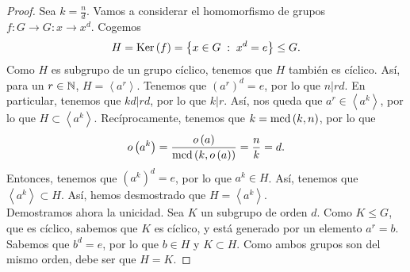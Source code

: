 \begin{proof}
Sea $\displaystyle k = \frac{n}{d} $. Vamos a considerar el homomorfismo de grupos $\displaystyle f : G \to G : x \to x^{d} $. Cogemos 
\[  H = \operatorname{Ker}\left(f\right) = \left\{ x \in G \; : \; x^{d} = e\right\} \leq G.\]
Como $\displaystyle H $ es subgrupo de un grupo cíclico, tenemos que $\displaystyle H $ también es cíclico. Así, para un $\displaystyle r \in \mathbb{N} $, $\displaystyle H = \left\langle a^{r} \right\rangle  $. Tenemos que $\displaystyle \left(a^{r}\right)^{d} = e $, por lo que $\displaystyle n | rd $. En particular, tenemos que $\displaystyle kd | rd $, por lo que $\displaystyle k |r $. Así, nos queda que $\displaystyle a^{r} \in \left\langle a^{k} \right\rangle  $, por lo que $\displaystyle H \subset \left\langle a^{k} \right\rangle  $. Recíprocamente, tenemos que $\displaystyle k = \text{mcd}\left(k,n\right) $, por lo que
\[o\left(a^{k}\right) = \frac{o\left(a\right)}{\text{mcd}\left(k, o\left(a\right)\right)} = \frac{n}{k } = d .\]
Entonces, tenemos que $\displaystyle \left(a^{k}\right)^{d} = e $, por lo que $\displaystyle a^{k} \in H $. Así, tenemos que $\displaystyle \left\langle a^{k} \right\rangle \subset H $. Así, hemos desmostrado que $\displaystyle H = \left\langle a^{k} \right\rangle  $. \\
Demostramos ahora la unicidad. Sea $\displaystyle K $ un subgrupo de orden $\displaystyle d $. Como $\displaystyle K \leq G $, que es cíclico, sabemos que $\displaystyle K $ es cíclico, y está generado por un elemento $\displaystyle a^{r} = b $. Sabemos que $\displaystyle b^{d} = e $, por lo que $\displaystyle b \in H $ y $\displaystyle K \subset H $. Como ambos grupos son del mismo orden, debe ser que $\displaystyle H = K $. 
\end{proof}
